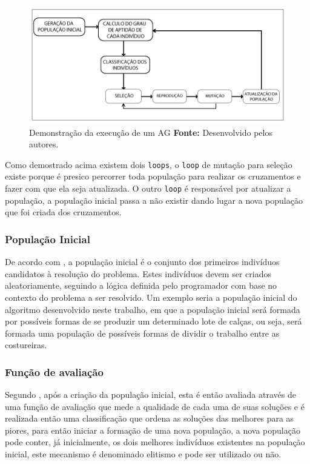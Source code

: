 \begin{figure}[h!]
	\centerline{\includegraphics[scale=0.6]{./imagens/algoritimos_geneticos.jpg}}
	\caption[Demonstração da execução de um AG]
	{Demonstração da execução de um AG \textbf{Fonte:} Desenvolvido pelos autores.}
	\label{fig:exemplo1}
\end{figure}

\par Como demostrado acima existem dois \texttt{loops}, o
\texttt{loop} de mutação para seleção existe porque é presico percorrer toda
população para realizar os cruzamentos e fazer com que ela seja
atualizada.
O outro \texttt{loop} é responsável por atualizar a população, a
população inicial passa a não existir dando lugar a nova população que foi criada dos cruzamentos.

\subsubsection{População Inicial}

\par De acordo com , a população inicial 
é o conjunto dos primeiros indivíduos candidatos à resolução do problema. Estes
indivíduos devem ser criados aleatoriamente, seguindo a lógica definida pelo programador com base no contexto do 
problema a ser resolvido. Um exemplo seria a população inicial do algoritmo desenvolvido neste trabalho, 
em que a população inicial será formada por possíveis formas de se produzir um determinado lote de calças, 
ou seja, será formada uma população de possíveis formas de dividir o trabalho entre as costureiras.

\subsubsection{Função de avaliação}

\par Segundo , após a criação da população
inicial, esta é então avaliada através de uma função de avaliação que mede a
qualidade de cada uma de suas soluções e é realizada então uma classificação que ordena as soluções das melhores para as
piores, para então iniciar a formação de uma nova população, a nova população
pode conter, já inicialmente, os dois melhores indivíduos existentes na
população inicial, este mecanismo é denominado elitismo e pode ser utilizado ou
não.

